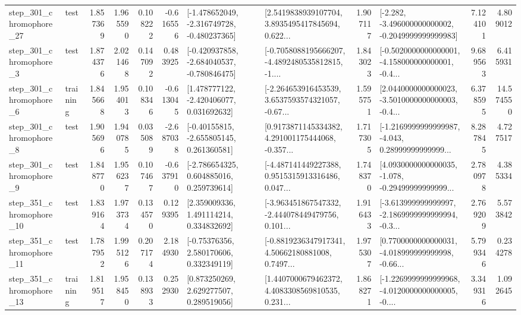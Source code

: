 \begin{tabular}{llrrrrllrlrr}
  step\_301\_chromophore\_27 &      test &      1.857369 &    1.965590 &      0.108222 & -0.616556 &  [-1.478652049, -2.316749728, -0.480237365] &  [2.5419838939107704, 3.8935495417845694, 0.622... &       1.907117 &  [-2.282, -3.496000000000002, -0.2049999999999983] &            7.124101 &          4.809012 \\
   step\_301\_chromophore\_3 &      test &      1.874376 &    2.021468 &      0.147092 &  0.483925 &  [-0.420937858, -2.684040537, -0.780846475] &  [-0.7058088195666207, -4.4892480535812815, -1.... &       1.843023 &  [-0.5020000000000001, -4.158000000000001, -0.4... &            9.689563 &          6.415931 \\
   step\_301\_chromophore\_6 &  training &      1.845668 &    1.954013 &      0.108346 & -0.613045 &    [1.478777122, -2.420406077, 0.031692632] &  [-2.264653916453539, 3.6537593574321057, -0.67... &       1.595751 &  [2.0440000000000023, -3.5010000000000003, -0.4... &            6.378595 &         14.574550 \\
   step\_301\_chromophore\_8 &      test &      1.905696 &    1.940785 &      0.035089 & -2.687038 &    [-0.40155815, -2.655805145, 0.261360581] &  [0.9173871145334382, 4.291001175444068, -0.357... &       1.717305 &  [-1.2169999999999987, -4.043, 0.28999999999999... &            8.287845 &          4.727517 \\
   step\_301\_chromophore\_9 &      test &      1.848770 &    1.956237 &      0.107467 & -0.637910 &    [-2.786654325, 0.604885016, 0.259739614] &  [-4.487141449227388, 0.9515315913316486, 0.047... &       1.748370 &  [4.0930000000000035, -1.078, -0.29499999999999... &            2.780978 &          4.385334 \\
  step\_351\_chromophore\_10 &      test &      1.839164 &    1.973734 &      0.134570 &  0.129395 &     [2.359009336, 1.491114214, 0.334832692] &  [-3.963451867547332, -2.444078449479756, 0.101... &       1.916433 &  [-3.613999999999997, -2.1869999999999994, -0.3... &            2.769209 &          5.573842 \\
  step\_351\_chromophore\_11 &      test &      1.787952 &    1.995126 &      0.207174 &  2.184930 &     [-0.75376356, 2.580170606, 0.332349119] &  [-0.8819236347917341, 4.50662180881008, 0.7497... &       1.975307 &  [0.7700000000000031, -4.018999999999998, -0.66... &            5.799346 &          0.234278 \\
  step\_351\_chromophore\_13 &  training &      1.819517 &    1.958450 &      0.138933 &  0.252930 &     [0.873250269, 2.629277507, 0.289519056] &  [1.4407000679462372, 4.4083308569810535, 0.231... &       1.868271 &  [-1.2269999999999968, -4.0120000000000005, -0.... &            3.349316 &          1.092645 \\

\end{tabular}
